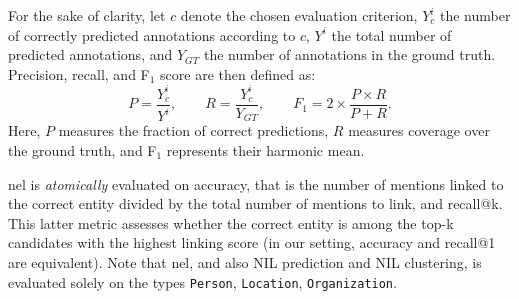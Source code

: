 For the sake of clarity, let $c$ denote the chosen evaluation criterion, $Y^i_c$ the number of correctly predicted annotations according to $c$, $Y^i$ the total number of predicted annotations, and $Y_{GT}$ the number of annotations in the ground truth.  
Precision, recall, and F$_1$ score are then defined as:
\begin{equation}
P = \frac{Y^i_c}{Y^i}, \qquad
R = \frac{Y^i_c}{Y_{GT}}, \qquad
F_1 = 2 \times \frac{P \times R}{P + R}.
\end{equation}
Here, $P$ measures the fraction of correct predictions, $R$ measures coverage over the ground truth, and F$_1$ represents their harmonic mean.






\ac{nel} is \textit{atomically} evaluated on accuracy, that is the number of mentions linked to the correct entity divided by the total number of mentions to link, and recall@k. This latter metric assesses whether the correct entity is among the top-k candidates with the highest linking score (in our setting, accuracy and recall@1 are equivalent). Note that \ac{nel}, and also NIL prediction and NIL clustering, is evaluated solely on the types \texttt{Person}, \texttt{Location}, \texttt{Organization}. 

